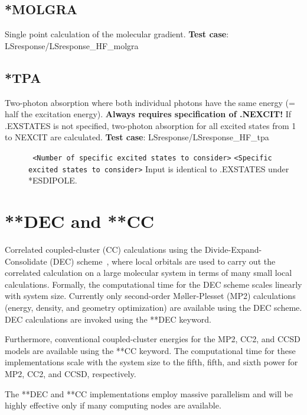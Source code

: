 \subsection{*MOLGRA}\label{subsec:molgra}
Single point calculation of the molecular gradient. \newline
{\bf Test case}: LSresponse/LSresponse\_HF\_molgra 

\subsection{*TPA}\label{subsec:tpa}
Two-photon absorption where both individual photons
have the same energy (= half the excitation energy).
{\bf Always requires specification of .NEXCIT!}
If .EXSTATES is not specified, two-photon absorption
for all excited states from 1 to NEXCIT
are calculated. \newline
{\bf Test case}: LSresponse/LSresponse\_HF\_tpa 
\begin{description}
\item[] \verb| | \newline
\verb|<Number of specific excited states to consider>|\newline
\verb|<Specific excited states to consider>|\newline
Input is identical to .EXSTATES under *ESDIPOLE.
\end{description}


\section{**DEC and **CC}\label{sec:dec}
Correlated coupled-cluster (CC) calculations using the Divide-Expand-Consolidate (DEC) scheme~\cite{dec1,dec2,dec3,dec4,dec5,dec6}, where
local orbitals are used to carry out the correlated calculation on a large molecular system in terms of many small local calculations.
Formally, the computational time for the DEC scheme scales linearly with system size.
Currently only second-order M{\o}ller-Plesset (MP2) calculations (energy, density, and geometry optimization) are available using the DEC scheme. 
DEC calculations are invoked using the **DEC keyword.

Furthermore, conventional coupled-cluster energies for the MP2, CC2, and CCSD models are available using the **CC keyword. The computational time for these implementations scale with the system size to the fifth, fifth, and sixth power for MP2, CC2, and CCSD, respectively.

The **DEC and **CC implementations employ massive parallelism and will be highly effective only if many computing nodes are available.

